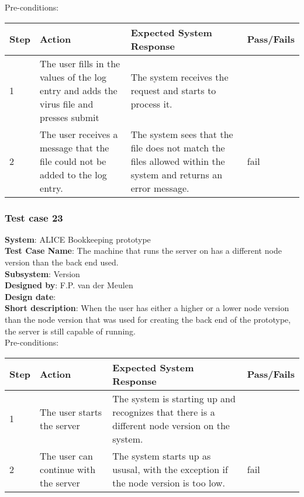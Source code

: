 Pre-conditions: \\

\begin{longtable}{ | p{0.8cm} | p{4.5cm} | p{6cm} | p{1.5cm} |}
\hline
Step & Action & Expected System Response & Pass/Fails  \\ \hline
1 & The user fills in the values of the log entry and adds the virus file and presses submit & The system receives the request and starts to process it. &  \\ \hline
2 & The user receives a message that the file could not be added to the log entry. & The system sees that the file does not match the files allowed within the system and returns an error message. & fail\\ \hline
 
\end{longtable}
\subsubsection{Test case 23}
\textbf{System}:  ALICE Bookkeeping prototype \\
\textbf{Test Case Name}:  The machine that runs the server on has a different node version than the back end used.  \\
\textbf{Subsystem}:  Version \\
\textbf{Designed by}:  F.P. van der Meulen\\
\textbf{Design date}:  \\
\textbf{Short description}: When the user has either a higher or a lower node version than the node version that was used for creating the back end of the prototype, the server is still capable of running. \\

Pre-conditions: \\

\begin{longtable}{ | p{0.8cm} | p{4.5cm} | p{6cm} | p{1.5cm} |}
\hline
Step & Action & Expected System Response & Pass/Fails  \\ \hline
1 & The user starts the server & The system is starting up and recognizes that there is a different node version on the system. &  \\ \hline
2 & The user can continue with the server & The system starts up as ususal, with the exception if the node version is too low. & fail\\ \hline
 
\end{longtable}